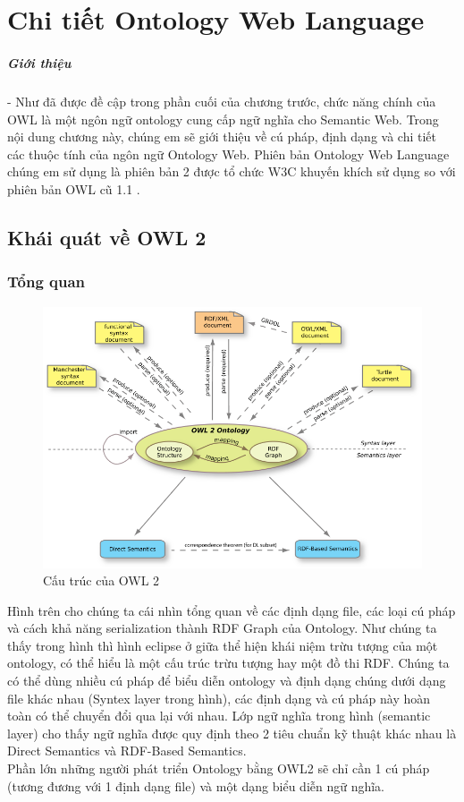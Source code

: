 \chapter{Chi tiết Ontology Web Language}
\paragraph{Giới thiệu } - Như đã được đề cập trong phần cuối của chương trước, chức năng chính của OWL là một ngôn ngữ ontology cung cấp ngữ nghĩa cho Semantic Web. Trong nội dung chương này, chúng em sẽ giới thiệu về cú pháp, định dạng và chi tiết các thuộc tính của ngôn ngữ Ontology Web. Phiên bản Ontology Web Language chúng em sử dụng là phiên bản 2 \cite{owl2} được tổ chức W3C khuyến khích sử dụng so với phiên bản OWL cũ 1.1 .
\section{Khái quát về OWL 2}
\subsection{Tổng quan}
\begin{figure}[ht!]
	\centering
	\includegraphics[width=120mm]{Figures/owl2structure.png}
	\caption{Cấu trúc của OWL 2\label{overflow}}
\end{figure}
Hình trên cho chúng ta cái nhìn tổng quan về các định dạng file, các loại cú pháp và cách khả năng serialization thành RDF Graph của Ontology. Như chúng ta thấy trong hình thì hình eclipse ở giữa thể hiện khái niệm trừu tượng của một ontology, có thể hiểu là một cấu trúc trừu tượng hay một đồ thi RDF. Chúng ta có thể dùng nhiều cú pháp để biểu diễn ontology và định dạng chúng dưới dạng file khác nhau (Syntex layer trong hình), các định dạng và cú pháp này hoàn toàn có thể chuyển đổi qua lại với nhau. Lớp ngữ nghĩa trong hình (semantic layer) cho thấy ngữ nghĩa được quy định theo 2 tiêu chuẩn kỹ thuật khác nhau là Direct Semantics và RDF-Based Semantics.
\\
Phần lớn những người phát triển Ontology bằng OWL2 sẽ chỉ cần 1 cú pháp (tương đương với 1 định dạng file) và một dạng biểu diễn ngữ nghĩa.
